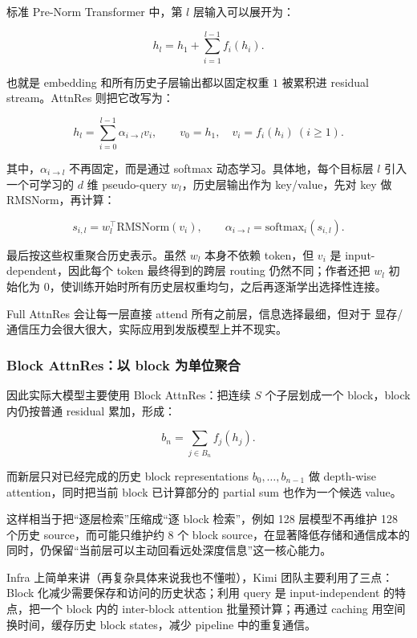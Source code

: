 \documentclass[
  11pt,
  a4paper,
  fontset=none]{ctexart}
\begin{document}
标准 Pre-Norm Transformer 中，第 \(l\) 层输入可以展开为：

\[
h_l=h_1+\sum_{i=1}^{l-1}f_i(h_i).
\]

也就是 embedding 和所有历史子层输出都以固定权重 \(1\) 被累积进 residual
stream。AttnRes 则把它改写为：

\[
h_l=\sum_{i=0}^{l-1}\alpha_{i\rightarrow l}v_i,
\qquad v_0=h_1,\quad v_i=f_i(h_i)\ (i\ge 1).
\]

其中，\(\alpha_{i\rightarrow l}\) 不再固定，而是通过 softmax
动态学习。具体地，每个目标层 \(l\) 引入一个可学习的 \(d\) 维
pseudo-query \(w_l\)，历史层输出作为 key/value，先对 key 做
RMSNorm，再计算：

\[
s_{i,l}=w_l^\top\mathrm{RMSNorm}(v_i),
\qquad
\alpha_{i\rightarrow l}=\mathrm{softmax}_i(s_{i,l}).
\]

最后按这些权重聚合历史表示。虽然 \(w_l\) 本身不依赖 token，但 \(v_i\) 是
input-dependent，因此每个 token 最终得到的跨层 routing
仍然不同；作者还把 \(w_l\) 初始化为
\(0\)，使训练开始时所有历史层权重均匀，之后再逐渐学出选择性连接。

Full AttnRes 会让每一层直接 attend 所有之前层，信息选择最细，但对于
显存/通信压力会很大很大，实际应用到发版模型上并不现实。

\subsubsection{Block AttnRes：以 block
为单位聚合}\label{block-attnresux4ee5-block-ux4e3aux5355ux4f4dux805aux5408}

因此实际大模型主要使用 Block AttnRes：把连续 \(S\) 个子层划成一个
block，block 内仍按普通 residual 累加，形成：

\[
b_n=\sum_{j\in B_n}f_j(h_j).
\]

而新层只对已经完成的历史 block representations \(b_0,\ldots,b_{n-1}\) 做
depth-wise attention，同时把当前 block 已计算部分的 partial sum
也作为一个候选 value。

这样相当于把``逐层检索''压缩成``逐 block 检索''，例如 128 层模型不再维护
128 个历史 source，而可能只维护约 8 个 block
source，在显著降低存储和通信成本的同时，仍保留``当前层可以主动回看远处深度信息''这一核心能力。

Infra 上简单来讲（再复杂具体来说我也不懂啦），Kimi
团队主要利用了三点：Block 化减少需要保存和访问的历史状态；利用 query 是
input-independent 的特点，把一个 block 内的 inter-block attention
批量预计算；再通过 caching 用空间换时间，缓存历史 block states，减少
pipeline 中的重复通信。
\end{document}
